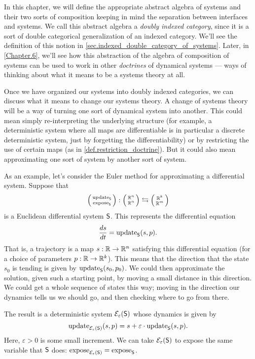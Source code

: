 \documentclass[DynamicalBook]{subfiles}
\begin{document}
In this chapter, we will define the appropriate abstract algebra of systems and
their two sorts of composition keeping in mind the separation between interfaces
and systems. We call this abstract algebra a \emph{doubly indexed category},
since it is a sort of double categorical generalization of an indexed category.
We'll see the definition of this notion in
\cref{sec.indexed_double_category_of_systems}. Later, in \cref{Chapter.6}, we'll see how this abstraction of the algebra of composition of systems can be used to work in other \emph{doctrines} of dynamical systems --- ways of thinking about what it means to be a systems theory at all.

Once we have organized our systems into doubly indexed categories, we can
discuss what it means to change our systems theory. A change of systems theory will be a way
of turning one sort of dynamical system into another. This could mean simply
re-interpreting the underlying structure (for example, a deterministic system
where all maps are differentiable is in particular a discrete deterministic
system, just by forgetting the differentiability) or by restricting the use of
certain maps (as in \cref{def.restriction_doctrine}). But it could also mean
approximating one sort of system by another sort of system.

As an example, let's consider the Euler method for approximating a differential
system. Suppose that
\[
\lens{\update{S}}{\expose{S}} : \lens{\rr^{n}}{\rr^n} \fromto \lens{\rr^k}{\rr^m}
\]
is a Euclidean differential system $\mathsf{S}$. This represents the differential equation
\[
\frac{ds}{dt} = \mathrm{update}_{\mathsf{S}}(s, p).
\]
That is, a trajectory is a map $s : \mathbb{R} \to \mathbb{R}^n$ satisfying this differential
equation (for a choice of parameters $p : \mathbb{R} \to \mathbb{R}^k$). This means that the
direction that the state $s_0$ is tending is given by $\mathrm{update}_{\mathsf{S}}(s_0, p_0)$. We
could then approximate the solution, given such a starting point, by moving a
small distance in this direction. We could get a whole sequence of states this
way; moving in the direction our dynamics tells us we should go, and then
checking where to go from there.

The result is a deterministic system $\mathcal{E}_{\varepsilon}(\mathsf{S})$ whose
dynamics is given by
\[
\mathrm{update}_{\mathsf{\mathcal{E}_{\varepsilon}(\mathsf{S})}}(s, p) = s + \varepsilon \cdot
\mathrm{update}_{\mathsf{S}}(s, p).
\]
Here, $\varepsilon > 0$ is some small increment. We can take $\mathcal{E}_{\varepsilon}(\mathsf{S})$ to expose the same variable that
$\mathsf{S}$ does: $\mathrm{expose}_{\mathsf{\mathcal{E}_{\varepsilon}(\mathsf{S})}} = \mathrm{expose}_{\mathsf{S}}$.
\end{document}
